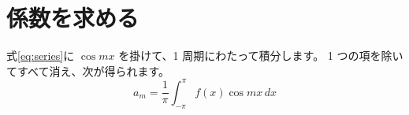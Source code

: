 \section{係数を求める}\label{sec:coefficients}
式\eqref{eq:series}に $\cos mx$ を掛けて、1 周期にわたって積分します。
1 つの項を除いてすべて消え、次が得られます。
\begin{equation}\label{eq:coefficients}
  a_m = \frac{1}{\pi}\int_{-\pi}^{\pi} f(x)\cos mx\,dx
\end{equation}
